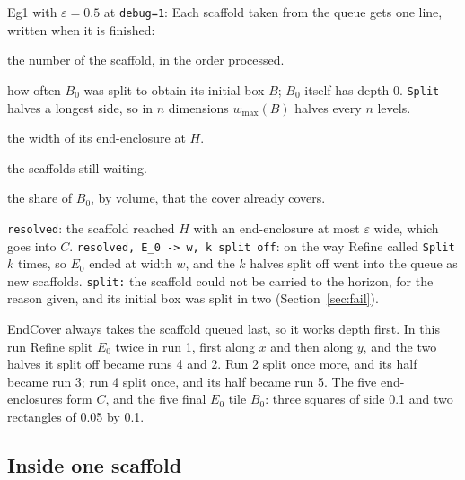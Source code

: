 \documentclass[11pt,a4paper]{article}
\newcommand{\out}[2][]{\VerbatimInput[fontsize=\footnotesize,#1]{#2}}
\newcommand{\eps}{\varepsilon}
\newcommand{\wmax}{w_{\max}}
\begin{document}
Eg1 with $\eps = 0.5$ at \texttt{debug=1}:
\out{out/debug1.txt}
Each scaffold taken from the queue gets one line, written when it is
finished:
\begin{description}[font=\ttfamily\mdseries,leftmargin=2em,style=nextline]
  \item[run] the number of the scaffold, in the order processed.
  \item[depth] how often $B_0$ was split to obtain its initial box $B$;
        $B_0$ itself has depth 0. \texttt{Split} halves a longest side, so
        in $n$ dimensions $\wmax(B)$ halves every $n$ levels.
  \item[wmax(E\_m)] the width of its end-enclosure at $H$.
  \item[queue] the scaffolds still waiting.
  \item[done] the share of $B_0$, by volume, that the cover already covers.
  \item[outcome] \texttt{resolved}: the scaffold reached $H$ with an
        end-enclosure at most $\eps$ wide, which goes into $C$.
        \texttt{resolved, E\_0 -> w, k split off}: on the way Refine called
        \texttt{Split} $k$ times, so $E_0$ ended at width $w$, and the $k$
        halves split off went into the queue as new scaffolds.
        \texttt{split:} the scaffold could not be carried to the
        horizon, for the reason given, and its initial box was split in two
        (Section~\ref{sec:fail}).
\end{description}
EndCover always takes the scaffold queued last, so it works depth first. In
this run Refine split $E_0$ twice in run 1, first along $x$ and then along
$y$, and the two halves it split off became runs 4 and 2. Run 2 split once
more, and its half became run 3; run 4 split once, and its half became
run 5. The five end-enclosures form $C$, and the five final $E_0$ tile
$B_0$: three squares of side 0.1 and two rectangles of 0.05 by 0.1.

\subsection{Inside one scaffold}
\end{document}
